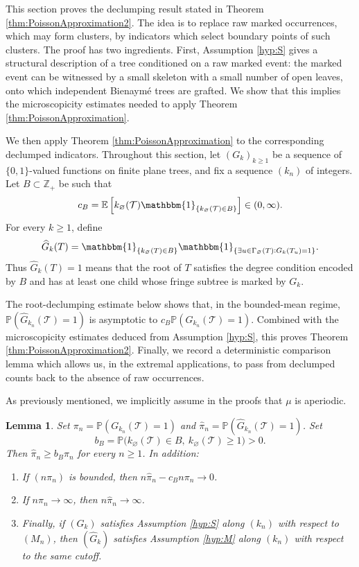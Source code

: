\documentclass[a4paper,11pt]{article}
\newtheorem{lemma}[theorem]{Lemma}
\newcommand{\E}{\mathbb{E}}
\DeclareRobustCommand{\P}{\mathbb{P}}
\DeclareRobustCommand{\1}{\mathbf{1}}
\begin{document}
This section proves the declumping result stated in Theorem
\ref{thm:PoissonApproximation2}. The idea is to replace raw marked
occurrences, which may form clusters, by indicators which select boundary
points of such clusters. The proof has two ingredients. First, Assumption
\ref{hyp:S} gives a structural description of a tree conditioned on a raw
marked event: the marked event can be witnessed by a small skeleton with a
small number of open leaves, onto which independent Bienaym\'e trees are
grafted. We show that this implies the microscopicity estimates needed to
apply Theorem \ref{thm:PoissonApproximation}.

We then apply Theorem \ref{thm:PoissonApproximation} to the corresponding
declumped indicators. Throughout this section, let $(G_k)_{k\ge1}$ be a
sequence of $\{0,1\}$-valued functions on finite plane trees, and fix a
sequence $(k_n)$ of integers. Let $B\subset\mathbb Z_+$ be such that
$$
  c_B
  =
  \E\left[
    k_\varnothing(\mathcal T)
    \mathbbm{1}_{\{k_\varnothing(\mathcal T)\in B\}}
  \right]
  \in(0,\infty).
$$
For every $k\ge1$, define
$$
  \widehat G_k(T)
  =
  \mathbbm{1}_{\{k_\varnothing(T)\in B\}}
  \mathbbm{1}_{\{\exists u\in\Gamma_\varnothing(T):G_k(T_u)=1\}}.
$$
Thus $\widehat G_k(T)=1$ means that the root of $T$ satisfies the degree
condition encoded by $B$ and has at least one child whose fringe subtree is
marked by $G_k$.

The root-declumping estimate below shows that, in the bounded-mean regime,
$\P(\widehat G_{k_n}(\mathcal T)=1)$ is asymptotic to
$c_B\P(G_{k_n}(\mathcal T)=1)$. Combined with the microscopicity estimates
deduced from Assumption \ref{hyp:S}, this proves Theorem
\ref{thm:PoissonApproximation2}. Finally, we record a deterministic comparison
lemma which allows us, in the extremal applications, to pass from declumped
counts back to the absence of raw occurrences.
 
 As previously mentioned, we implicitly assume in the proofs that $\mu$ is aperiodic.



\begin{lemma}
\label{lem:root_declumping}
Set $\pi_n=\P(G_{k_n}(\mathcal T)=1)$ and
$\widehat{\pi}_n=\P(\widehat{G}_{k_n}(\mathcal T)=1)$.
Set
$$
b_B=\P\bigl(k_\varnothing(\mathcal T)\in B,\
k_\varnothing(\mathcal T)\ge1\bigr)>0.
$$
Then $\widehat\pi_n\ge b_B\pi_n$ for every $n \geq 1$. In addition:
\begin{enumerate}
\item[(i)]  If $(n\pi_n)$ is bounded, then $
n\widehat{\pi}_n-c_B n\pi_n\to0$.
\item[(ii)] If $n\pi_n\to\infty$, then $n\widehat{\pi}_n\to\infty$.
\item[(iii)] Finally, if $(G_k)$ satisfies Assumption \ref{hyp:S} along $(k_n)$ with
respect to $(M_n)$, then $(\widehat G_k)$ satisfies Assumption \ref{hyp:M}
along $(k_n)$ with respect to the same cutoff.
\end{enumerate}
\end{lemma}
  
\end{document}
